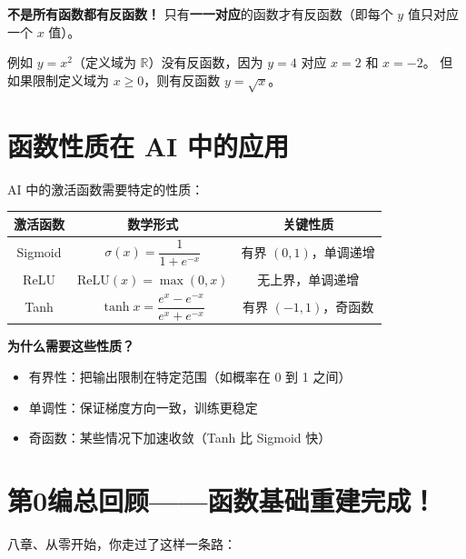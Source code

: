 \begin{notebox}
\textbf{不是所有函数都有反函数！}
只有\textbf{一一对应}的函数才有反函数（即每个 \(y\) 值只对应一个 \(x\) 值）。

例如 \(y = x^2\)（定义域为 \(\mathbb{R}\)）没有反函数，因为 \(y=4\) 对应 \(x=2\) 和 \(x=-2\)。
但如果限制定义域为 \(x \ge 0\)，则有反函数 \(y = \sqrt{x}\)。
\end{notebox}


\section{函数性质在 AI 中的应用}

\begin{examplebox}[8——激活函数]
AI 中的激活函数需要特定的性质：

\begin{center}
\begin{tabular}{c|c|c}
\textbf{激活函数} & \textbf{数学形式} & \textbf{关键性质} \\
\hline
Sigmoid & \(\sigma(x) = \dfrac{1}{1 + e^{-x}}\) & 有界 \((0,1)\)，单调递增 \\
ReLU & \(\text{ReLU}(x) = \max(0, x)\) & 无上界，单调递增 \\
Tanh & \(\tanh x = \dfrac{e^x - e^{-x}}{e^x + e^{-x}}\) & 有界 \((-1,1)\)，奇函数 \\
\end{tabular}
\end{center}

\textbf{为什么需要这些性质？}
\begin{itemize}
  \item 有界性：把输出限制在特定范围（如概率在 0 到 1 之间）
  \item 单调性：保证梯度方向一致，训练更稳定
  \item 奇函数：某些情况下加速收敛（Tanh 比 Sigmoid 快）
\end{itemize}
\end{examplebox}


\section{第0编总回顾——函数基础重建完成！}

八章、从零开始，你走过了这样一条路：

